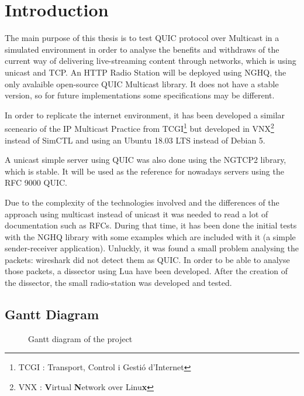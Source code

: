 \clearpage\section{Introduction}

{
    The main purpose of this thesis is to test QUIC protocol over Multicast in a simulated environment in order to analyse the benefits and withdraws of the current
    way of delivering live-streaming content through networks, which is using unicast and TCP. An HTTP Radio Station will be deployed using NGHQ, the only avalaible
    open-source QUIC Multicast library. It does not have a stable version, so for future implementations some specifications may be different.

    In order to replicate the internet environment, it has been developed a similar sceneario of the IP Multicast Practice from TCGI\footnote{TCGI : Transport, Control
    i Gestió d'Internet} but developed in VNX\footnote{VNX : \textbf{V}irtual \textbf{N}etwork over Linu\textbf{x}} instead of SimCTL and using an Ubuntu 18.03 LTS
    instead of Debian 5.

    A unicast simple server using QUIC was also done using the NGTCP2 library, which is stable. It will be used as the reference for nowadays servers using the RFC 9000 QUIC.
    
    Due to the complexity of the technologies involved and the differences of the approach using multicast instead of unicast it was needed to read a lot of documentation
    such as RFCs. During that time, it has been done the initial tests with the NGHQ library with some examples which are included with it (a simple sender-receiver application).
    Unluckly, it was found a small problem analysing the packets: wireshark did not detect them as QUIC. In order to be able to analyse those packets, a dissector using Lua
    have been developed. After the creation of the dissector, the small radio-station was developed and tested.
}

\subsection{Gantt Diagram}
\label{ssec:gantt}
\begin{figure}[H]
    \centering
    
    \caption[Project's Gantt diagram]{\footnotesize{Gantt diagram of the project}}
    \label{fig:gantt}
\end{figure}

